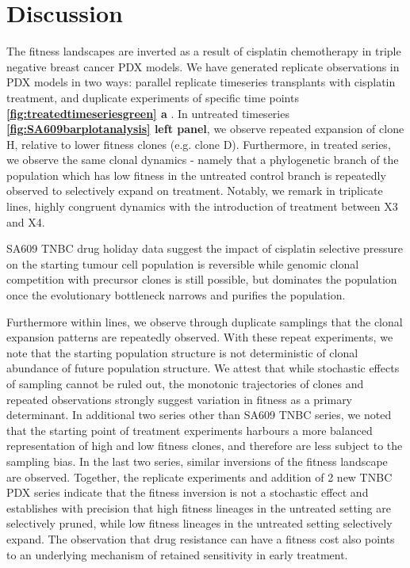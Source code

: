 \section{Discussion}
The fitness landscapes are inverted as a result of cisplatin chemotherapy in  triple negative breast cancer PDX models.  We have generated replicate observations in PDX models in two ways: parallel replicate timeseries transplants with cisplatin treatment, and duplicate experiments of specific time points \textbf{\autoref{fig:treatedtimeseriesgreen} a} . In untreated timeseries \textbf{\autoref{fig:SA609barplotanalysis} left panel}, we observe repeated expansion of clone H, relative to lower fitness clones (e.g. clone D). Furthermore, in treated series, we observe the same clonal dynamics - namely that a phylogenetic branch of the population which has low fitness in the untreated control branch is repeatedly observed to selectively expand on treatment.  Notably, we remark in triplicate lines,  highly congruent dynamics with the introduction of treatment between X3 and X4. 

SA609 TNBC drug holiday data suggest the impact of cisplatin selective pressure on the starting tumour cell population is reversible while genomic clonal competition with precursor clones is still possible, but dominates the population once the evolutionary bottleneck narrows and purifies the population.

Furthermore within lines, we observe through duplicate samplings that the clonal expansion patterns are repeatedly observed. With these repeat experiments, we note that the starting population structure is not deterministic of clonal abundance of future population structure.  We attest that while stochastic effects of sampling cannot be ruled out, the monotonic trajectories of clones and repeated observations strongly suggest variation in fitness as a primary determinant. In additional two series other than SA609 TNBC series, we noted that the starting point of treatment experiments harbours a more balanced representation of high and low fitness clones, and therefore are less subject to the sampling bias.  In the last two series, similar inversions of the fitness landscape are observed.  Together, the replicate experiments and addition of 2 new TNBC PDX series indicate that the fitness inversion is not a stochastic effect and establishes with precision that high fitness lineages in the untreated setting are selectively pruned, while low fitness lineages in the untreated setting selectively expand. The observation that drug resistance can have a fitness cost also points to an underlying mechanism of retained sensitivity in early treatment.




